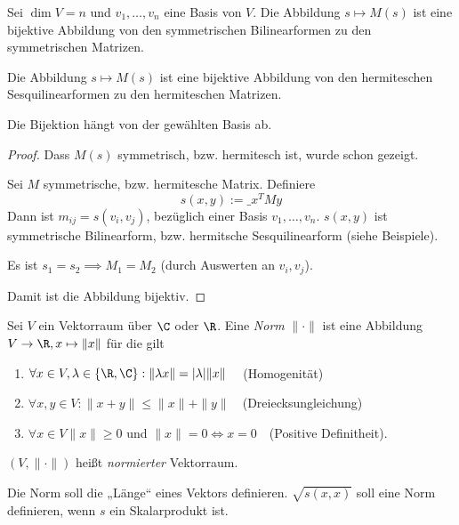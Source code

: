 \documentclass{mycourse}
\begin{document}
\begin{prop}
	\label{prop:13.4}
	Sei $\dim V=n$ und $v_1,\dotsc, v_n$ eine Basis von $V$.
	Die Abbildung $s \mapsto M(s)$ ist eine bijektive Abbildung von den symmetrischen Bilinearformen zu den symmetrischen Matrizen.

	Die Abbildung $s \mapsto M(s)$ ist eine bijektive Abbildung von den hermiteschen Sesquilinearformen zu den hermiteschen Matrizen.

	\begin{note}
		Die Bijektion hängt von der gewählten Basis ab.
	\end{note}

	\begin{proof}
		Dass $M(s)$ symmetrisch, bzw. hermitesch ist, wurde schon gezeigt.

		Sei $M$ symmetrische, bzw. hermitesche Matrix.
		Definiere
		\[
			s(x,y) := \_x^TMy
		\]
		Dann ist $m_{ij} = s(v_i,v_j)$, bezüglich einer Basis $v_1,\dotsc, v_n$.
		$s(x,y)$ ist symmetrische Bilinearform, bzw. hermitsche Sesquilinearform (siehe Beispiele).

		Es ist $s_1=s_2 \implies M_1 = M_2$ (durch Auswerten an $v_i,v_j$).

		Damit ist die Abbildung bijektiv.
	\end{proof}
\end{prop}


\begin{df}
	\label{df:13.5}
	Sei $V$ ein Vektorraum über $\C$ oder $\R$.
	Eine \emph{Norm} $\|\cdot\|$ ist eine Abbildung $V\to \R, x\mapsto \|x\|$ für die gilt
	\begin{enumerate}[({N}1)]
		\item
			$\forall x\in V, \lambda \in \{\R,\C\} : \| \lambda x\| = |\lambda | \|x\|\quad$ (Homogenität)
		\item
			$\forall x,y\in V: \|x+y\| \le \|x\| + \|y\|\quad $(Dreiecksungleichung)
		\item
			$\forall x\in V \|x\| \ge 0$ und $\|x\| = 0 \iff x=0\quad $(Positive Definitheit).
	\end{enumerate}
	$(V, \|\cdot\|)$ heißt \emph{normierter} Vektorraum.

	\begin{note}
		Die Norm soll die „Länge“ eines Vektors definieren.
		$\sqrt{s(x,x)}$ soll eine Norm definieren, wenn $s$ ein Skalarprodukt ist.
	\end{note}
\end{df}
\end{document}
